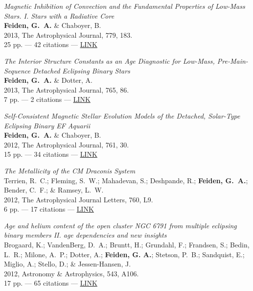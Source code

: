 \documentclass[12pt,letter]{article}
\begin{document}
\begin{etaremune}[leftmargin=0.30in]
	\item {\it Magnetic Inhibition of Convection and the Fundamental Properties of Low-Mass Stars. I. Stars with a Radiative Core} \\
          {\bf Feiden, G.~A.} \& Chaboyer, B. \\
          2013, The Astrophysical Journal, 779, 183. \\
          25 pp. --- 42 citations --- \href{http://adsabs.harvard.edu/abs/2013ApJ...779..183F/}{LINK}

    \item {\it The Interior Structure Constants as an Age Diagnostic for Low-Mass, Pre-Main-Sequence Detached Eclipsing Binary Stars} \\
          {\bf Feiden, G.~A.} \& Dotter, A. \\
          2013, The Astrophysical Journal, 765, 86. \\
          7 pp. --- 2 citations --- \href{http://adsabs.harvard.edu/abs/2013ApJ...765...86F}{LINK}
          
    \item {\it Self-Consistent Magnetic Stellar Evolution Models of the Detached, Solar-Type Eclipsing Binary EF Aquarii} \\
          {\bf Feiden, G.~A.} \& Chaboyer, B. \\
          2012, The Astrophysical Journal, 761, 30. \\
          15 pp. --- 34 citations --- \href{http://adsabs.harvard.edu/abs/2012ApJ...761...30F}{LINK}
          
    \item {\it The Metallicity of the CM Draconis System} \\
          Terrien, R.~C.; Fleming, S.~W.; Mahadevan, S.; Deshpande, R.; {\bf Feiden, G.~A.}; Bender, C.~F.; \& Ramsey, L.~W. \\
          2012, The Astrophysical Journal Letters, 760, L9. \\ 
          6 pp. --- 17 citations --- \href{http://adsabs.harvard.edu/abs/2012ApJ...760L...9T}{LINK}
          
    \item {\it Age and helium content of the open cluster NGC 6791 from multiple eclipsing binary members II. age dependencies and new insights} \\
          Brogaard, K.; VandenBerg, D.~A.; Bruntt, H.;  Grundahl, F.; Frandsen, S.; Bedin, L.~R.; Milone, A.~P.; Dotter, A.; {\bf Feiden, G. A.}; Stetson, P.~B.; Sandquist, E.; Miglio, A.; Stello, D.; \& Jessen-Hansen, J. \\
          2012, Astronomy \& Astrophysics, 543, A106. \\
          17 pp. --- 65 citations --- \href{http://adsabs.harvard.edu/abs/2012A&A...380A.106B}{LINK}
          

\end{etaremune}
\end{document}
